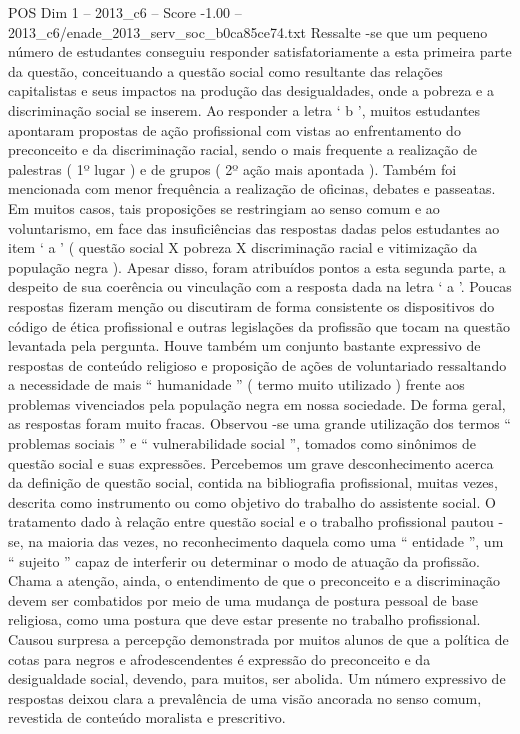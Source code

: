 \begin{textsample}{POS Dim 1 – 2013\_c6 – Score -1.00 – 2013\_c6/enade\_2013\_serv\_soc\_b0ca85ce74.txt}
Ressalte -se que um pequeno número de estudantes conseguiu responder satisfatoriamente a esta primeira parte da questão, conceituando a questão social como resultante das relações capitalistas e seus impactos na produção das desigualdades, onde a pobreza e a discriminação social se inserem.
Ao responder a letra ‘ b ’, muitos estudantes apontaram propostas de ação profissional com vistas ao enfrentamento do preconceito e da discriminação racial, sendo o mais frequente a realização de palestras ( 1º lugar ) e de grupos ( 2º ação mais apontada ).
Também foi mencionada com menor frequência a realização de oficinas, debates e passeatas.
Em muitos casos, tais proposições se restringiam ao senso comum e ao voluntarismo, em face das insuficiências das respostas dadas pelos estudantes ao item ‘ a ’ ( questão social X pobreza X discriminação racial e vitimização da população negra ).
Apesar disso, foram atribuídos pontos a esta segunda parte, a despeito de sua coerência ou vinculação com a resposta dada na letra ‘ a ’.
Poucas respostas fizeram menção ou discutiram de forma consistente os dispositivos do código de ética profissional e outras legislações da profissão que tocam na questão levantada pela pergunta.
Houve também um conjunto bastante expressivo de respostas de conteúdo religioso e proposição de ações de voluntariado ressaltando a necessidade de mais “ humanidade ” ( termo muito utilizado ) frente aos problemas vivenciados pela população negra em nossa sociedade.
De forma geral, as respostas foram muito fracas.
Observou -se uma grande utilização dos termos “ problemas sociais ” e “ vulnerabilidade social ”, tomados como sinônimos de questão social e suas expressões.
Percebemos um grave desconhecimento acerca da definição de questão social, contida na bibliografia profissional, muitas vezes, descrita como instrumento ou como objetivo do trabalho do assistente social.
O tratamento dado à relação entre questão social e o trabalho profissional pautou -se, na maioria das vezes, no reconhecimento daquela como uma “ entidade ”, um “ sujeito ” capaz de interferir ou determinar o modo de atuação da profissão.
Chama a atenção, ainda, o entendimento de que o preconceito e a discriminação devem ser combatidos por meio de uma mudança de postura pessoal de base religiosa, como uma postura que deve estar presente no trabalho profissional.
Causou surpresa a percepção demonstrada por muitos alunos de que a política de cotas para negros e afrodescendentes é expressão do preconceito e da desigualdade social, devendo, para muitos, ser abolida.
Um número expressivo de respostas deixou clara a prevalência de uma visão ancorada no senso comum, revestida de conteúdo moralista e prescritivo.

\end{textsample}
